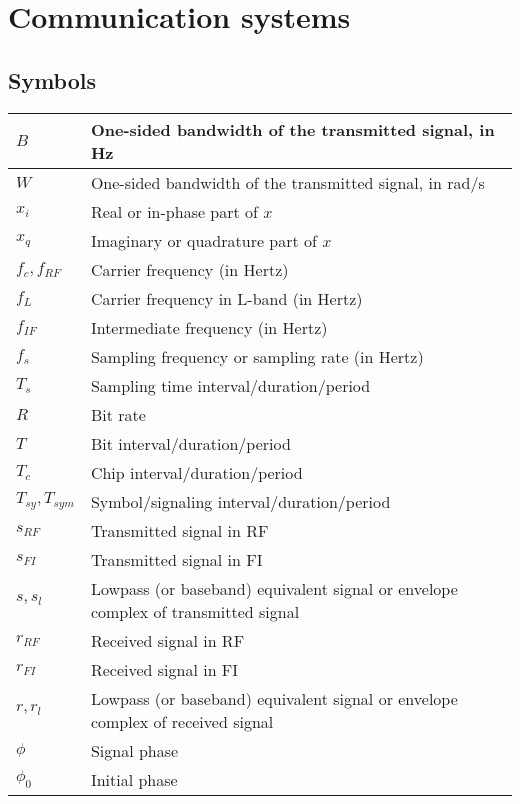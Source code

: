 \documentclass{article}
\begin{document}
\section{Communication systems}
\subsection{Symbols}
\begin{xltabular}{\textwidth}{XX}
    \(B\) & One-sided bandwidth of the transmitted signal, in Hz\\ \hline
    \(W\) & One-sided bandwidth of the transmitted signal, in rad/s\\ \hline
    \(x_i\) & Real or in-phase part of \(x\)\\ \hline
    \(x_q\) & Imaginary or quadrature part of \(x\)\\ \hline
    \(f_c, f_{RF}\) & Carrier frequency (in Hertz)\\ \hline
    \(f_L\) & Carrier frequency in L-band (in Hertz)\\ \hline
    \(f_{IF}\) & Intermediate frequency (in Hertz)\\ \hline
    \(f_{s}\) & Sampling frequency or sampling rate (in Hertz)\\ \hline
    \(T_{s}\) & Sampling time interval/duration/period\\ \hline
    \(R\) & Bit rate\\ \hline
    \(T\) & Bit interval/duration/period\\ \hline
    \(T_c\) & Chip interval/duration/period\\ \hline
    \(T_{sy}, T_{sym}\) & Symbol/signaling\cite{proakisDigitalCommunications2007} interval/duration/period\\ \hline
    \(s_{RF}\) & Transmitted signal in RF\\ \hline
    \(s_{FI}\) & Transmitted signal in FI\\ \hline
    \(s, s_l\) & Lowpass (or baseband) equivalent signal or envelope complex of transmitted signal\\ \hline
    \(r_{RF}\) & Received signal in RF\\ \hline
    \(r_{FI}\) & Received signal in FI\\ \hline
    \(r, r_l\) & Lowpass (or baseband) equivalent signal or envelope complex of received signal\\ \hline
    \(\phi\) & Signal phase\\ \hline
    \(\phi_0\) & Initial phase\\ \hline

\end{xltabular}
\end{document}
